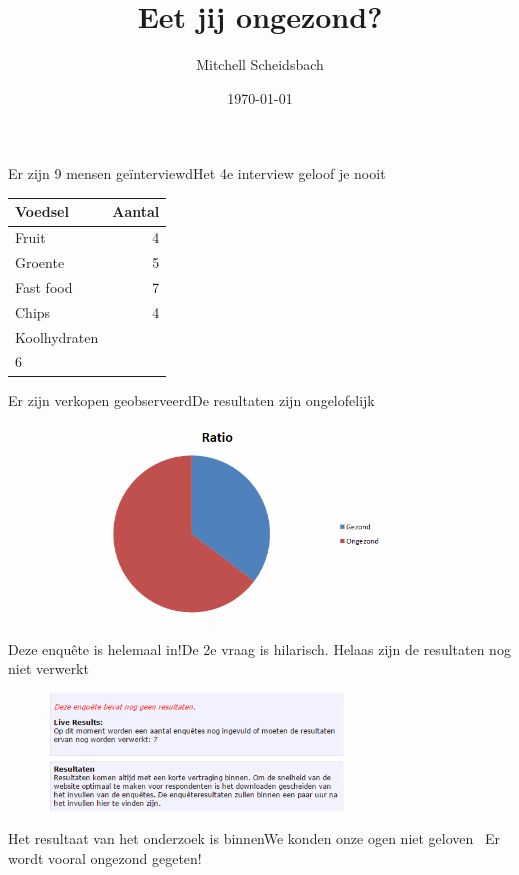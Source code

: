 \documentclass{beamer}
\title{Eet jij ongezond?}
\author{Mitchell Scheidsbach}
\institute{Hogeschool Rotterdam}
\date{\today}
\begin{document}
\begin{frame}
  \titlepage
\end{frame}


\begin{frame}{Er zijn 9 mensen geïnterviewd\newline Het 4e interview geloof je nooit}

\begin{table}
	\centering
	\begin{tabular}{l|r}
		Voedsel & Aantal \\\hline
		Fruit & 4 \\
		Groente & 5 \\
		Fast food & 7 \\
		Chips & 4 \\
		Koolhydraten \\ 6
	\end{tabular}
\end{table}

\end{frame}


\begin{frame}{Er zijn verkopen geobserveerd\newline De resultaten zijn ongelofelijk}

\begin{figure}[!ht]
	\centering
	\includegraphics[width=0.8\textwidth]{piechart.png}
	\centering
	\label{label:file_name}
\end{figure}

\end{frame}


\begin{frame}{Deze enquête is helemaal in!\newline De 2e vraag is hilarisch.}
Helaas zijn de resultaten nog niet verwerkt

\begin{figure}[!ht]
	\centering
	\includegraphics[width=0.7\textwidth]{resultaten.png}
	\centering
	\label{label:file_name}
\end{figure}
\end{frame}


\begin{frame}{Het resultaat van het onderzoek is binnen\newline We konden onze ogen niet geloven}
\
\centering\LARGE Er wordt vooral ongezond gegeten!
\end{frame}
\end{document}
